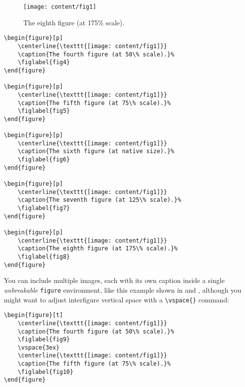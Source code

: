 \begin{figure}[p]
    \centerline{\texttt{[image: content/fig1]}}
    \caption{The eighth figure (at 175\% scale).}%
\end{figure}

\begin{verbatim}
\begin{figure}[p]
    \centerline{\texttt{[image: content/fig1]}}
    \caption{The fourth figure (at 50\% scale).}%
    \figlabel{fig4}
\end{figure}

\begin{figure}[p]
    \centerline{\texttt{[image: content/fig1]}}
    \caption{The fifth figure (at 75\% scale).}%
    \figlabel{fig5}
\end{figure}

\begin{figure}[p]
    \centerline{\texttt{[image: content/fig1]}}
    \caption{The sixth figure (at native size).}%
    \figlabel{fig6}
\end{figure}

\begin{figure}[p]
    \centerline{\texttt{[image: content/fig1]}}
    \caption{The seventh figure (at 125\% scale).}%
    \figlabel{fig7}
\end{figure}

\begin{figure}[p]
    \centerline{\texttt{[image: content/fig1]}}
    \caption{The eighth figure (at 175\% scale).}%
    \figlabel{fig8}
\end{figure}
\end{verbatim}

You can include multiple images, each with its own caption inside a
single \emph{unbreakable} \texttt{figure} environment, like this
example shown in  and , although
you might want to adjust interfigure vertical space with a
\verb=\vspace{}= command:

\begin{verbatim}
\begin{figure}[t]
    \centerline{\texttt{[image: content/fig1]}}
    \caption{The fourth figure (at 50\% scale).}%
    \figlabel{fig9}
    \vspace{3ex}
    \centerline{\texttt{[image: content/fig1]}}
    \caption{The fifth figure (at 75\% scale).}%
    \figlabel{fig10}
\end{figure}
\end{verbatim}

